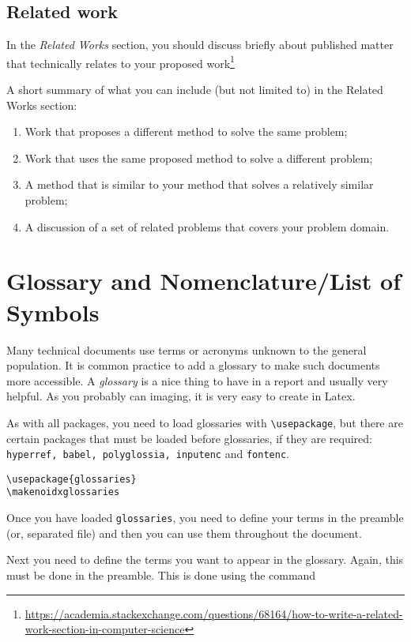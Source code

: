  
\subsection{Related work}
\label{sec:relatedwork}

In the \textit{Related Works} section, you should discuss briefly about published matter that technically relates to your proposed work\footnote{\url{https://academia.stackexchange.com/questions/68164/how-to-write-a-related-work-section-in-computer-science}}

A short summary of what you can include (but not limited to) in the Related Works section:
\begin{enumerate}
\item Work that proposes a different method to solve the same problem;
\item Work that uses the same proposed method to solve a different problem;
\item A method that is similar to your method that solves a relatively similar problem;
\item A discussion of a set of related problems that covers your problem domain.
\end{enumerate}
    

\section{Glossary and Nomenclature/List of Symbols} %
\label{sec:glossary}

Many technical documents use terms or acronyms unknown to the general population. It is common practice to add a glossary to make such documents more accessible. A \textit{glossary} is a nice thing to have in a report and usually very helpful. As you probably can imaging, it is very easy to create in Latex. 

As with all packages, you need to load glossaries with \verb|\usepackage|, but there are certain packages that must be loaded before glossaries, if they are required: \texttt{hyperref, babel, polyglossia, inputenc} and \texttt{fontenc}.

\begin{verbatim}
\usepackage{glossaries} 
\makenoidxglossaries
\end{verbatim}

Once you have loaded \texttt{glossaries}, you need to define your terms in the preamble (or, separated file) and then you can use them throughout the document. 

Next you need to define the terms you want to appear in the glossary. Again, this must be done in the preamble. This is done using the command

